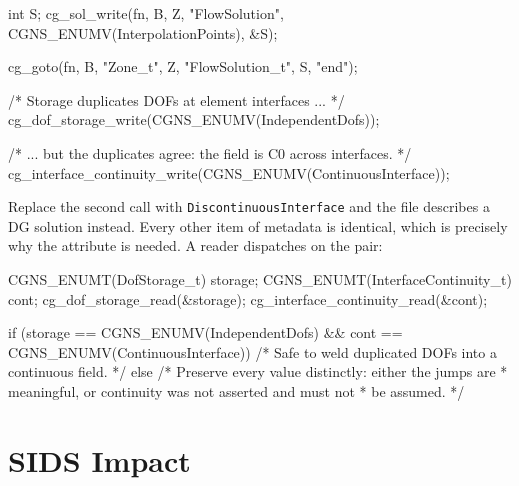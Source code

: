 \documentclass[11pt,letterpaper]{article}
\makeatletter
\let\cgns@orig@lstlisting\lstlisting
\let\cgns@endorig@lstlisting\endlstlisting
\renewenvironment{lstlisting}
  {\par\needspace{5\baselineskip}\nolinenumbers\cgns@orig@lstlisting}
  {\cgns@endorig@lstlisting\par\linenumbers}
\makeatother
\begin{document}
\begin{lstlisting}[language=C]
int S;
cg_sol_write(fn, B, Z, "FlowSolution",
    CGNS_ENUMV(InterpolationPoints), &S);

cg_goto(fn, B, "Zone_t", Z, "FlowSolution_t", S, "end");

/* Storage duplicates DOFs at element interfaces ... */
cg_dof_storage_write(CGNS_ENUMV(IndependentDofs));

/* ... but the duplicates agree: the field is C0 across interfaces. */
cg_interface_continuity_write(CGNS_ENUMV(ContinuousInterface));
\end{lstlisting}

Replace the second call with \texttt{DiscontinuousInterface} and the
file describes a DG solution instead.  Every other item of metadata is
identical, which is precisely why the attribute is needed.  A reader
dispatches on the pair:

\begin{lstlisting}[language=C]
CGNS_ENUMT(DofStorage_t) storage;
CGNS_ENUMT(InterfaceContinuity_t) cont;
cg_dof_storage_read(&storage);
cg_interface_continuity_read(&cont);

if (storage == CGNS_ENUMV(IndependentDofs) &&
    cont    == CGNS_ENUMV(ContinuousInterface)) {
    /* Safe to weld duplicated DOFs into a continuous field. */
} else {
    /* Preserve every value distinctly: either the jumps are
     * meaningful, or continuity was not asserted and must not
     * be assumed. */
}
\end{lstlisting}

\section{SIDS Impact}
\label{sec:sids-impact}
\end{document}
